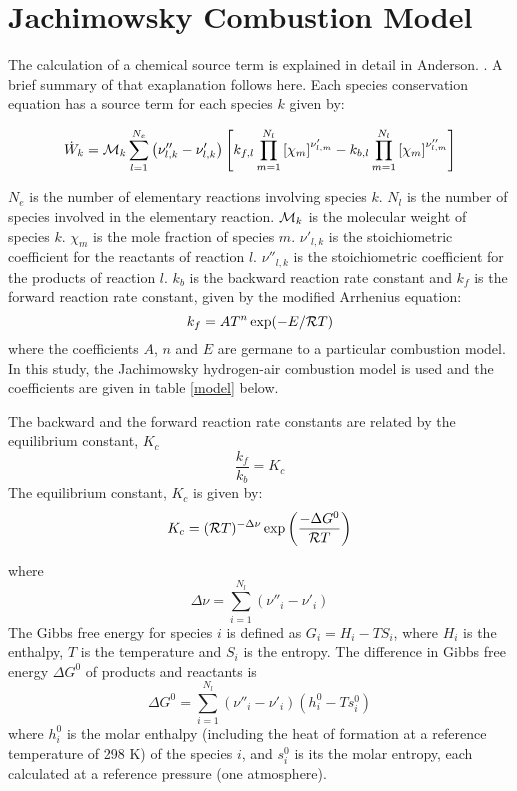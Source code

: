 \section{Jachimowsky Combustion Model}

The calculation of a chemical source term is explained in detail in Anderson. \cite{gen:anderson2}.
A brief summary of that exaplanation follows here.
Each species conservation equation has a source term for each species $k$ given by:

\begin{displaymath}
\dot{W}_k = {\cal M}_k \sum_{l=1}^{N_e} \left( \nu''_{l,k} - \nu'_{l,k} \right)
\left[ k_{f,l} \prod_{m=1}^{N_l} \left[ \chi_m \right]^{\nu'_{l,m}}
- k_{b,l} \prod_{m=1}^{N_l} \left[ \chi_m \right]^{\nu''_{l,m}} \right]
\end{displaymath}

$N_e$ is the number of elementary reactions involving species $k$.
$N_l$ is the number of species involved in the elementary reaction.
${\cal M}_k$ is the molecular weight of species $k$.
$\chi_m$ is the mole fraction of species $m$.
$\nu'_{l,k}$ is the stoichiometric coefficient for the reactants of reaction $l$.
$\nu''_{l,k}$ is the stoichiometric coefficient for the products of reaction $l$.
$k_b$ is the backward reaction rate constant and
$k_f$ is the forward reaction rate constant, given by the
modified Arrhenius equation:
\begin{displaymath}
k_f = AT^n \exp(-E/{\cal R}T)
\end{displaymath}
where the coefficients $A$, $n$ and $E$ are germane to a particular combustion
model. In this study, the Jachimowsky hydrogen-air combustion model is used 
\cite{chem:jachimowsky} and the coefficients are given in table \ref{model} 
below.

The backward and the forward reaction rate constants are related by the
equilibrium constant, $K_c$
\begin{displaymath}
\frac{k_f}{k_b} = K_c
\end{displaymath}
The equilibrium constant, $K_c$ is given by:
\begin{displaymath}
K_c = ({\cal R} T)^{-\Delta \nu}
       \exp \left( \frac{-\Delta G^0}{{\cal R} T} \right)
\end{displaymath}

where
\begin{displaymath}
\Delta \nu = \sum_{i=1}^{N_l} (\nu''_i - \nu'_i)
\end{displaymath}
The Gibbs free energy for species $i$
is defined as $G_i = H_i - T S_i$, where $H_i$ is the
enthalpy, $T$ is the temperature and $S_i$ is the entropy.
The difference in Gibbs free energy $\Delta G^0$ of products and reactants is
\begin{displaymath}
\Delta G^0 = \sum_{i=1}^{N_l} (\nu''_i - \nu'_i) \left( h^0_i - T s^0_i \right)
\end{displaymath}
where $h^0_i$ is the molar enthalpy (including the heat of formation at a
reference temperature of 298 K)
of the species $i$, and $s^0_i$ is its the molar entropy,
each calculated at a reference pressure (one atmosphere).\\
\\

